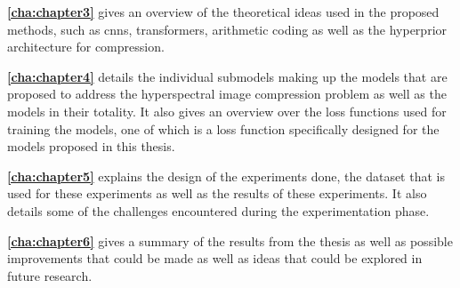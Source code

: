 \textbf{\autoref{cha:chapter3}} gives an overview of the theoretical ideas used in the proposed methods, such as \acp{cnn}, transformers, arithmetic coding as well as the hyperprior architecture for compression.

\textbf{\autoref{cha:chapter4}} details the individual submodels making up the models that are proposed to address the hyperspectral image compression problem as well as the models in their totality. It also gives an overview over the loss functions used for training the models, one of which is a loss function specifically designed for the models proposed in this thesis.

\textbf{\autoref{cha:chapter5}} explains the design of the experiments done, the dataset that is used for these experiments as well as the results of these experiments. It also details some of the challenges encountered during the experimentation phase.

\textbf{\autoref{cha:chapter6}} gives a summary of the results from the thesis as well as possible improvements that could be made as well as ideas that could be explored in future research.